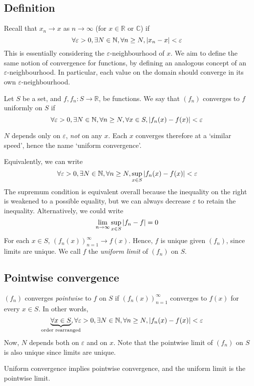 \subsection{Definition}
Recall that \( x_n \to x \) as \( n \to \infty \) (for \( x \in \mathbb R\) or \(\mathbb C\)) if
\[
	\forall \varepsilon > 0, \exists N \in \mathbb N, \forall n \geq N, \abs{x_n-x} < \varepsilon
\]
This is essentially considering the \( \varepsilon \)-neighbourhood of \( x \).
We aim to define the same notion of convergence for functions, by defining an analogous concept of an \( \varepsilon \)-neighbourhood.
In particular, each value on the domain should converge in its own \( \varepsilon \)-neighbourhood.
\begin{definition}
	Let \( S \) be a set, and \( f, f_n \colon S \to \mathbb R \), be functions.
	We say that \( (f_n) \) converges to \( f \) uniformly on \( S \) if
	\[
		\forall \varepsilon > 0, \exists N \in \mathbb N, \forall n \geq N, \forall x \in S, \abs{f_n(x) - f(x)} < \varepsilon
	\]
\end{definition}
\begin{note}
	\( N \) depends only on \( \varepsilon \), \textit{not} on any \( x \).
	Each \( x \) converges therefore at a `similar speed', hence the name `uniform convergence'.
\end{note}
\noindent Equivalently, we can write
\[
	\forall \varepsilon > 0, \exists N \in \mathbb N, \forall n \geq N, \sup_{x \in S} \abs{f_n(x) - f(x)} < \varepsilon
\]
The supremum condition is equivalent overall because the inequality on the right is weakened to a possible equality, but we can always decrease \( \varepsilon \) to retain the inequality.
Alternatively, we could write
\[
	\lim_{n \to \infty} \sup_{x \in S} \abs{f_n - f} = 0
\]
For each \( x \in S \), \( (f_n(x))_{n=1}^\infty \to f(x) \).
Hence, \( f \) is unique given \( (f_n) \), since limits are unique.
We call \( f \) the \textit{uniform limit} of \( (f_n) \) on \( S \).

\subsection{Pointwise convergence}
\begin{definition}
	\( (f_n) \) converges \textit{pointwise} to \( f \) on \( S \) if \( (f_n(x))_{n=1}^\infty \) converges to \( f(x) \) for every \( x \in S \).
	In other words,
	\[
		\underbrace{\forall x \in S}_{\mathclap{\text{order rearranged}}}, \forall \varepsilon > 0, \exists N \in \mathbb N, \forall n \geq N, \abs{f_n(x) - f(x)} < \varepsilon
	\]
	Now, \( N \) depends both on \( \varepsilon \) and on \( x \).
	Note that the pointwise limit of \( (f_n) \) on \( S \) is also unique since limits are unique.
\end{definition}
\begin{remark}
	Uniform convergence implies pointwise convergence, and the uniform limit is the pointwise limit.
\end{remark}


